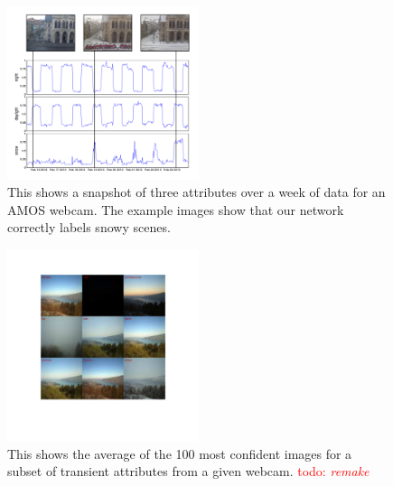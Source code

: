 \documentclass[10pt,twocolumn,letterpaper]{article}
\newcommand{\todo}[1]{\textcolor{red}{todo: {\em #1}}}
\begin{document}
\begin{figure}[t]
	\centering
		\includegraphics[width=0.5\textwidth, trim= 5mm 15mm 0mm 10mm]{figs/attr_compare.pdf}
		\caption{This shows a snapshot of three attributes over a week of data for
             an AMOS webcam.  The example images show that our network 
             correctly labels snowy scenes.}
		\label{fig:attrcmp}
\end{figure}

\begin{figure}[t]
	\centering
		\includegraphics[width=0.5\textwidth, trim= 35mm 50mm 30mm 31mm]{figs/montage_pruned_cam_00007371.pdf}
		\caption{This shows the average of the 100 most confident images for
             a subset of transient attributes from a given webcam.
             \todo{remake}} 
		\label{fig:netvis}
\end{figure}
\end{document}
